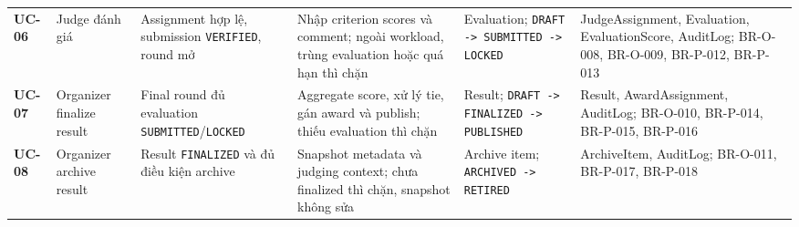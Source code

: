 \begin{table}[!ht]
\begin{tabularx}{\textwidth}{p{0.8cm}>{\raggedright\arraybackslash}p{1.6cm}>{\raggedright\arraybackslash}p{2.2cm}>{\raggedright\arraybackslash}p{2.8cm}>{\raggedright\arraybackslash}X>{\raggedright\arraybackslash}p{2.6cm}}
\textbf{UC-06} & Judge đánh giá & Assignment hợp lệ, submission \texttt{VERIFIED}, round mở & Nhập criterion scores và comment; ngoài workload, trùng evaluation hoặc quá hạn thì chặn & Evaluation; \texttt{DRAFT -> SUBMITTED -> LOCKED} & Judge\allowbreak Assignment, Evaluation, EvaluationScore, AuditLog; BR-O-008, BR-O-009, BR-P-012, BR-P-013 \\
\textbf{UC-07} & Organizer finalize result & Final round đủ evaluation \texttt{SUBMITTED}/\allowbreak\texttt{LOCKED} & Aggregate score, xử lý tie, gán award và publish; thiếu evaluation thì chặn & Result; \texttt{DRAFT -> FINALIZED -> PUBLISHED} & Result, Award\allowbreak Assignment, AuditLog; BR-O-010, BR-P-014, BR-P-015, BR-P-016 \\
\textbf{UC-08} & Organizer archive result & Result \texttt{FINALIZED} và đủ điều kiện archive & Snapshot metadata và judging context; chưa finalized thì chặn, snapshot không sửa & Archive item; \texttt{ARCHIVED -> RETIRED} & ArchiveItem, AuditLog; BR-O-011, BR-P-017, BR-P-018 \\
\bottomrule
\end{tabularx}
\end{table}
